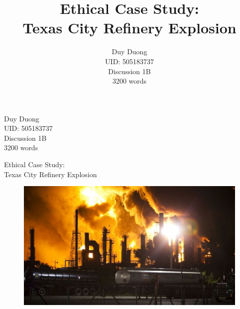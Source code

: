 \documentclass[12pt]{article}
\begin{document}
		\title{Ethical Case Study: \\Texas City Refinery Explosion}
	\author{Duy Duong\\UID: 505183737\\Discussion 1B\\3200 words}
	\date{}
		\setlength{\parindent}{0pt}
	\begin{flushleft}
		Duy Duong\\UID: 505183737\\Discussion 1B\\3200 words
	\end{flushleft}
	
	\begin{center}
		{\Huge Ethical Case Study: \\Texas City Refinery Explosion}
	\end{center}

	\setlength{\parindent}{4em}
	\setlength{\parskip}{1em}

	\begin{figure}[H]
		\centering
		\includegraphics[width=150mm]{explosion.jpg}
	\end{figure}

	\renewcommand*\contentsname{Table of Contents}
	\tableofcontents
	
\end{document}

